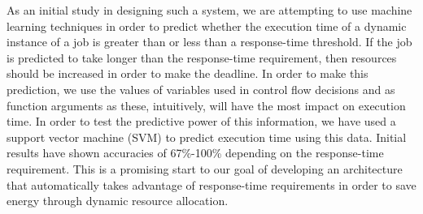As an initial study in designing such a system, we are attempting to use
machine learning techniques in order to predict whether the execution time of a
dynamic instance of a job is greater than or less than a response-time
threshold. If the job is predicted to take longer than the response-time
requirement, then resources should be increased in order to make the deadline.
In order to make this prediction, we use the values of variables used in
control flow decisions and as function arguments as these, intuitively, will
have the most impact on execution time. In order to test the predictive power
of this information, we have used a support vector machine (SVM) to predict
execution time using this data. Initial results have shown accuracies of
67\%-100\% depending on the response-time requirement. This is a promising
start to our goal of developing an architecture that automatically takes
advantage of response-time requirements in order to save energy through dynamic
resource allocation.

